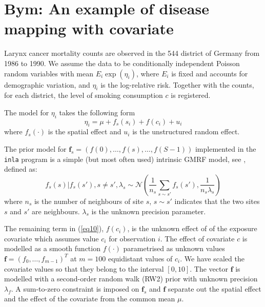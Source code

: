 \documentclass[a4paper,11pt]{article}
\def\mm#1{\ensuremath{\boldsymbol{#1}}} %
\begin{document}


\section*{Bym: An example of disease mapping with covariate }

Larynx cancer mortality counts are observed in the 544 district of
    Germany from 1986 to 1990. We assume
    the data to be conditionally independent Poisson random variables
    with mean $E_i \exp(\eta_i)$, where $E_i$ is fixed and accounts
    for demographic variation, and $\eta_i$ is the log-relative
    risk. Together with the counts, for each district, the level of
    smoking consumption $c$ is registered.

    The model for $\eta_i$ takes the following form
    \begin{equation}
        \label{eq10}
        \eta_i=\mu + f_s(s_i)+f(c_i)+u_i
    \end{equation}
    where  $f_s(\cdot)$ is the spatial effect and $u_i$ is the
    unstructured random effect. 
    
    The prior model for
    $\mm{f}_s=(f(0),\dots,f(s),\dots,f(S-1))$ implemented in the {\tt
      inla} program is a simple (but most often used) intrinsic GMRF
    model, see \cite[Ch. 3]{book80}, defined as:
    \begin{equation}\label{eq.besag}
      f_s(s)|f_s(s'),s\neq s',\lambda_s\sim\mathcal{N}(\frac{1}{n_s}\sum_{s\sim s'}f_s(s'),\frac{1}{n_s\lambda_s})
    \end{equation}
    where $n_s$ is the number of neighbours of site $s$, $s\sim s'$
    indicates that the two sites $s$ and $s'$ are neighbours.  $\lambda_s$
    is the unknown precision parameter.
    
    The remaining term in (\ref{eq10}),
    $f(c_i)$, is the unknown effect of of the exposure covariate which
    assumes value $c_i$ for observation $i$. The effect of covariate
    $c$ is modelled as a smooth function $f(\cdot)$ parametrised as
    unknown values $\mm{f}=(f_0,\dots,f_{m-1})^T$ at $m=100$
    equidistant values of $c_i$.  We have scaled the covariate values
    so that they belong to the interval $[0,10]$. The vector $\mm{f}$
    is modelled with a second-order random walk (RW2) prior with
    unknown precision $\lambda_f$. A sum-to-zero constraint is imposed
    on $\mm{f}_s$ and $\mm{f}$ separate out the spatial effect and the
    effect of the covariate from the common mean $\mu$.
\end{document}
